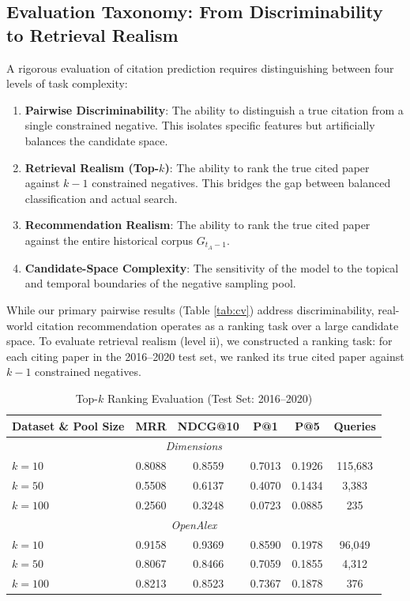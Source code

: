 \documentclass[11pt,a4paper]{article}
\begin{document}
\subsection{Evaluation Taxonomy: From Discriminability to Retrieval Realism}
A rigorous evaluation of citation prediction requires distinguishing between four levels of task complexity:
\begin{enumerate}
    \item \textbf{Pairwise Discriminability}: The ability to distinguish a true citation from a single constrained negative. This isolates specific features but artificially balances the candidate space.
    \item \textbf{Retrieval Realism (Top-$k$)}: The ability to rank the true cited paper against $k-1$ constrained negatives. This bridges the gap between balanced classification and actual search.
    \item \textbf{Recommendation Realism}: The ability to rank the true cited paper against the entire historical corpus $G_{t_A-1}$.
    \item \textbf{Candidate-Space Complexity}: The sensitivity of the model to the topical and temporal boundaries of the negative sampling pool.
\end{enumerate}

While our primary pairwise results (Table \ref{tab:cv}) address discriminability, real-world citation recommendation operates as a ranking task over a large candidate space. To evaluate retrieval realism (level ii), we constructed a ranking task: for each citing paper in the 2016--2020 test set, we ranked its true cited paper against $k-1$ constrained negatives.

\begin{table}[H]
\centering
\caption{Top-$k$ Ranking Evaluation (Test Set: 2016--2020)}
\label{tab:ranking}
\begin{tabular}{lccccc}
\toprule
\textbf{Dataset \& Pool Size} & \textbf{MRR} & \textbf{NDCG@10} & \textbf{P@1} & \textbf{P@5} & \textbf{Queries} \\
\midrule
\multicolumn{6}{c}{\textit{Dimensions}} \\
$k=10$ & 0.8088 & 0.8559 & 0.7013 & 0.1926 & 115,683 \\
$k=50$ & 0.5508 & 0.6137 & 0.4070 & 0.1434 & 3,383 \\
$k=100$ & 0.2560 & 0.3248 & 0.0723 & 0.0885 & 235 \\
\midrule
\multicolumn{6}{c}{\textit{OpenAlex}} \\
$k=10$ & 0.9158 & 0.9369 & 0.8590 & 0.1978 & 96,049 \\
$k=50$ & 0.8067 & 0.8466 & 0.7059 & 0.1855 & 4,312 \\
$k=100$ & 0.8213 & 0.8523 & 0.7367 & 0.1878 & 376 \\
\bottomrule
\end{tabular}
\end{table}
\end{document}
